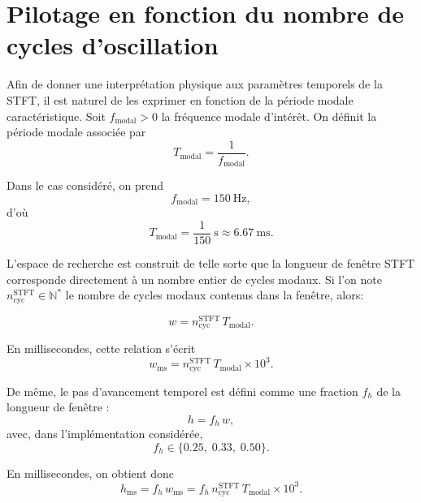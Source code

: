\documentclass[12pt,a4paper, openany]{book}
\begin{document}
\section{Pilotage en fonction du nombre de cycles d'oscillation}

Afin de donner une interprétation physique aux paramètres temporels de la STFT, il est naturel de les exprimer en fonction de la période modale caractéristique. Soit $f_{\mathrm{modal}} > 0$ la fréquence modale d'intérêt. On définit la période modale associée par
\begin{equation}
T_{\mathrm{modal}} = \frac{1}{f_{\mathrm{modal}}}.
\label{eq:t_modal_sst}
\end{equation}

Dans le cas considéré, on prend
\begin{equation}
f_{\mathrm{modal}} = 150~\mathrm{Hz},
\end{equation}
d'où
\begin{equation}
T_{\mathrm{modal}} = \frac{1}{150}~\mathrm{s} \approx 6.67~\mathrm{ms}.
\label{eq:t_modal_667}
\end{equation}

L'espace de recherche est construit de telle sorte que la longueur de fenêtre STFT corresponde directement à un nombre entier de cycles modaux. Si l'on note $n_{\mathrm{cyc}}^{\mathrm{STFT}} \in \mathbb{N}^{*}$ le nombre de cycles modaux contenus dans la fenêtre, alors:

\begin{equation}
w = n_{\mathrm{cyc}}^{\mathrm{STFT}}\, T_{\mathrm{modal}}.
\label{eq:win_cycles_sst}
\end{equation}

En millisecondes, cette relation s'écrit
\begin{equation}
w_{\mathrm{ms}} = n_{\mathrm{cyc}}^{\mathrm{STFT}}\, T_{\mathrm{modal}} \times 10^{3}.
\label{eq:win_cycles_ms}
\end{equation}

De même, le pas d'avancement temporel est défini comme une fraction $f_h$ de la longueur de fenêtre :
\begin{equation}
h = f_h\, w,
\label{eq:hop_fraction}
\end{equation}
avec, dans l'implémentation considérée,
\begin{equation}
f_h \in \{0.25,\;0.33,\;0.50\}.
\label{eq:hop_values}
\end{equation}

En millisecondes, on obtient donc
\begin{equation}
h_{\mathrm{ms}} = f_h\, w_{\mathrm{ms}} = f_h\, n_{\mathrm{cyc}}^{\mathrm{STFT}}\, T_{\mathrm{modal}} \times 10^{3}.
\label{eq:hop_ms}
\end{equation}
\end{document}
